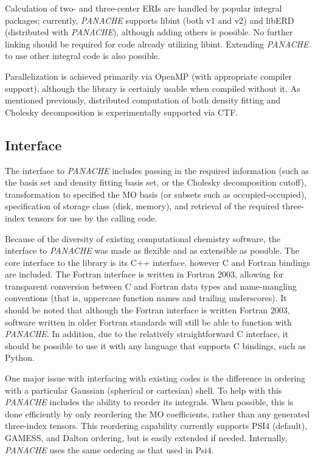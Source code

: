 \documentclass[12pt,letterpaper]{article}
\newcommand{\panache}{\textit{PANACHE}\xspace}
\begin{document}
Calculation of two- and three-center ERIs are handled by popular integral
packages; currently, \panache supports libint\cite{LibintLink, Libint1,
Libint2} (both v1 and v2) and libERD\cite{Flocke:2008a} (distributed with
\panache), although adding others is possible. No further linking should
be required for code already utilizing libint.  Extending \panache to
use other integral code is also possible.

Parallelization is achieved primarily via OpenMP (with appropriate
compiler support), although the library is certainly usable when compiled
without it. As mentioned previously, distributed computation of both
density fitting and Cholesky decomposition is experimentally supported
via CTF.


\subsection{Interface}
\label{sec:interface}

The interface to \panache includes passing in the required information
(such as the basis set and density fitting basis set, or the Cholesky
decomposition cutoff), transformation to specified the MO basis (or
subsets such as occupied-occupied), specification of storage class (disk,
memory), and retrieval of the required three-index tensors for use by
the calling code.

Because of the diversity of existing computational chemistry software,
the interface to \panache was made as flexible and as extensible as
possible. The core interface to the library is its C++ interface, however
C and Fortran bindings are included. The Fortran interface is written in
Fortran 2003, allowing for transparent conversion between C and Fortran
data types and name-mangling conventions (that is, uppercase function
names and trailing underscores). It should be noted that although the
Fortran interface is written Fortran 2003, software written in older
Fortran standards will still be able to function with \panache. In
addition, due to the relatively straightforward C interface, it should
be possible to use it with any language that supports C bindings, such
as Python.

One major issue with interfacing with existing codes is the difference
in ordering with a particular Gaussian (spherical or cartesian)
shell. To help with this \panache includes the ability to reorder its
integrals. When possible, this is done efficiently by only reordering
the MO coefficients, rather than any generated three-index tensors. This
reordering capability currently supports PSI4 (default), GAMESS, and
Dalton ordering, but is easily extended if needed. Internally, \panache
uses the same ordering as that used in Psi4.
\end{document}
